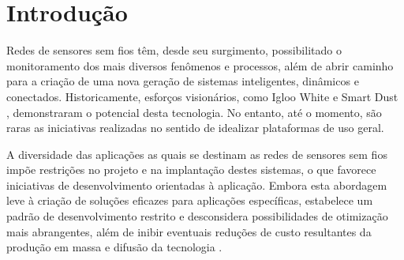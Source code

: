 \documentclass[
	12pt,				%
	openright,			%
	oneside,
	a4paper,			%
	english,			%
	french,				%
	spanish,			%
	brazil				%
	]{abntex2}
\begin{document}
\listoffigures*
\cleardoublepage

\listoftables*
\cleardoublepage



\tableofcontents*
\cleardoublepage



\textual

\chapter[Introdução]{Introdução}
Redes de sensores sem fios têm, desde seu surgimento, possibilitado o monitoramento dos mais diversos fenômenos e processos, além de abrir caminho para a criação de uma nova geração de sistemas inteligentes, dinâmicos e conectados. Historicamente, esforços visionários, como Igloo White \cite{Warneke2001} e Smart Dust \cite{Correl2004}, demonstraram o potencial desta tecnologia. No entanto, até o momento, são raras as iniciativas realizadas no sentido de idealizar plataformas de uso geral.

A diversidade das aplicações as quais se destinam as redes de sensores sem fios impõe restrições no projeto e na implantação destes sistemas, o que favorece iniciativas de desenvolvimento orientadas à aplicação. Embora esta abordagem leve à criação de soluções eficazes para aplicações específicas, estabelece um padrão de desenvolvimento restrito e desconsidera possibilidades de otimização mais abrangentes, além de inibir eventuais reduções de custo resultantes da produção em massa e difusão da tecnologia \cite{Rawat2014}. 
\end{document}
